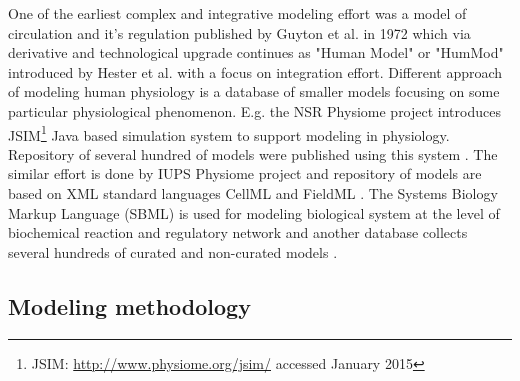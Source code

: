 One of the earliest complex and integrative modeling effort was a model of circulation and it's regulation published by Guyton et al. in 1972 \cite{Guyton1972} which via derivative and technological upgrade continues as "Human Model" or "HumMod" introduced by Hester et al. \cite{Hester2011systems,hester2011} with a focus on integration effort. Different approach of modeling human physiology is a database of smaller models focusing on some particular physiological phenomenon. E.g. the NSR Physiome project introduces  JSIM\footnote{JSIM: \url{http://www.physiome.org/jsim/} accessed January 2015} Java based simulation system to support modeling in  physiology. Repository of several hundred of models were published using this system \cite{Butterworth2014}. The similar effort is done by IUPS Physiome project and repository of models are  based on XML standard languages CellML and FieldML \cite{Hunter2004,Yu2011}. The Systems Biology Markup Language (SBML) is used for modeling biological system at the level of biochemical reaction and regulatory network and another database collects several hundreds of curated and non-curated models \cite{Hucka2004,LeNovere2006}.




\subsection{Modeling methodology}
\label{sec:methodsmodels}

